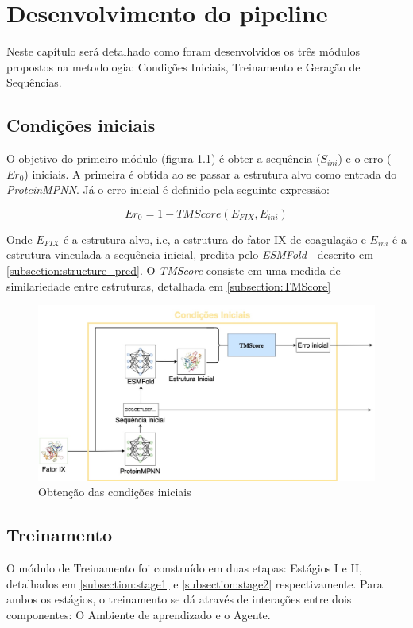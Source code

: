 \chapter{Desenvolvimento do pipeline}
Neste capítulo será detalhado como foram desenvolvidos os três módulos propostos na metodologia: 
Condições Iniciais, Treinamento e Geração de Sequências. 

\section{Condições iniciais}
O objetivo do primeiro módulo (figura \ref{fig:cond_iniciais}) é obter a sequência ($S_{ini}$) e o erro ($Er_{0}$) iniciais. 
A primeira é obtida ao se passar a estrutura alvo como entrada do \textit{ProteinMPNN}.
Já o erro inicial é definido pela seguinte expressão:
 
\begin{equation}
    Er_{0} = 1 - TMScore(E_{FIX}, E_{ini})
\end{equation}

\noindent
Onde $E_{FIX}$ é a estrutura alvo, i.e, a estrutura do fator IX de coagulação e $E_{ini}$ é a estrutura vinculada a sequência inicial, 
predita pelo \textit{ESMFold} - descrito em \ref{subsection:structure_pred}. 
O \textit{TMScore} consiste em uma medida de similariedade entre estruturas, detalhada em \ref{subsection:TMScore}

\begin{figure}[H]
  \centering
  \includegraphics[width=.8\textwidth]{figuras/metodologia-Initial_cond.jpg}
  \caption{Obtenção das condições iniciais}
  \label{fig:cond_iniciais}
\end{figure}

\section{Treinamento}
O módulo de Treinamento foi construído em duas etapas: Estágios I e II, detalhados em \ref{subsection:stage1} e \ref{subsection:stage2} respectivamente.
Para ambos os estágios, o treinamento se dá através de interações entre dois componentes: O Ambiente de aprendizado e o Agente. 

